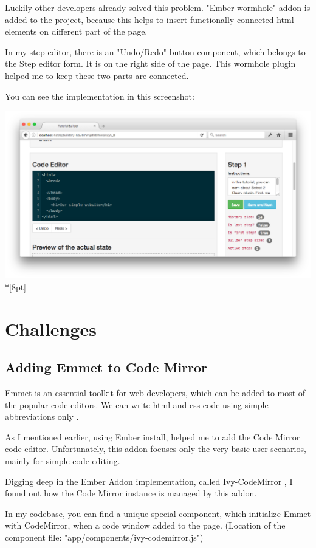 \documentclass[12pt, a4paper, oneside, openright, medskipamount]{report}
\begin{document}
Luckily other developers already solved this problem. "Ember-wormhole" addon is added to the project, because this helps to insert functionally connected html elements on different part of the page.

In my step editor, there is an "Undo/Redo" button component, which belongs to the Step editor form. It is on the right side of the page. This wormhole plugin helped me to keep these two parts are connected.

You can see the implementation in this screenshot:

\includegraphics[width=1\textwidth]{assets/wormhole-screenshot.png}\\*[8pt]

\section{Challenges}

\subsection{Adding Emmet to Code Mirror} \label{emmet}

Emmet is an essential toolkit for web-developers, which can be added to most of the popular code editors. We can write html and css code using simple abbreviations only \cite{emmet}.

As I mentioned earlier, using Ember install, helped me to add the Code Mirror code editor. Unfortunately, this addon focuses only the very basic user scenarios, mainly for simple code editing.

Digging deep in the Ember Addon implementation, called Ivy-CodeMirror \cite{ivy-codemirror}, I found out how the Code Mirror instance is managed by this addon.

In my codebase, you can find a unique special component, which initialize Emmet with CodeMirror, when a code window added to the page. (Location of the component file: "app/components/ivy-codemirror.js")
\end{document}
